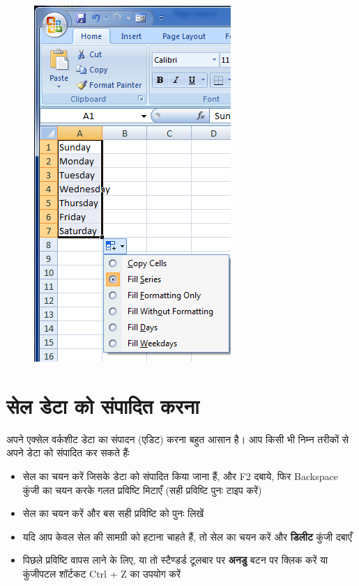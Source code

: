 \begin{figure}[t]
\includegraphics[scale=0.4]{src/images/chapter1/chapter1_fig54.png}
\end{figure}

\section{सेल डेटा को संपादित करना}\label{id-1.35}

अपने एक्सेल वर्कशीट डेटा का संपादन (एडिट) करना बहुत आसान है। आप किसी भी निम्न तरीकों से अपने डेटा को संपादित कर सकते हैंः

\begin{itemize}[topsep=-1ex,parsep=0ex,partopsep=0ex,itemsep=0.5ex]
\item सेल का चयन करें जिसके डेटा को संपादित किया जाना हैं, और  {\eng F2}  दबाये, फिर   {\eng Backspace}  कुंजी का चयन करके गलत प्रविष्टि मिटाएँ (सही प्रविष्टि पुनः टाइप करें)
\item सेल का चयन करें और बस सही प्रविष्टि को पुनः लिखें
\item यदि आप केवल सेल की सामग्री को हटाना चाहते हैं, तो सेल का चयन करें और \textbf{डिलीट} कुंजी दबाएँ
\item पिछले प्रविष्टि वापस लाने के लिए, या तो स्टैण्डर्ड टूलबार पर \textbf{अनडु} बटन पर क्लिक करें या कुंजीपटल शॉर्टकट  {\eng Ctrl + Z}   का उपयोग करें
\end{itemize}

